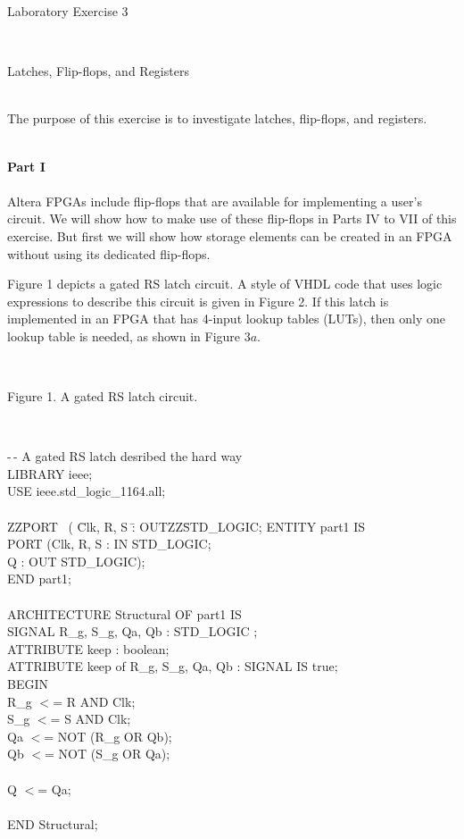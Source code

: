 \documentclass[epsfig,10pt,fullpage]{article}
\begin{document}
\centerline{\huge Laboratory Exercise 3}
~\\
\centerline{\large Latches, Flip-flops, and Registers}
~\\
\noindent
The purpose of this exercise is to investigate latches, flip-flops, and registers.

~\\
\noindent
{\bf Part I}
~\\
~\\
\noindent
\noindent
Altera FPGAs include flip-flops that are available for implementing a user's circuit. 
We will show how to make use of these flip-flops in Parts IV to VII of this exercise. But
first we will show how storage elements can be created in an FPGA without using 
its dedicated flip-flops.

Figure 1 depicts a gated RS latch circuit. A style of VHDL code that 
uses logic expressions to describe this circuit is given in Figure 2.
If this latch is implemented
in an FPGA that has 4-input lookup tables (LUTs), then only one lookup table is needed, 
as shown in Figure 3$a$. 
~\\

\begin{figure}[H]
\scriptsize
\centerline{
\hbox{}}
\end{figure}
~\\
\centerline{Figure 1.  A gated RS latch circuit.}
~\\
\begin{center}
\begin{minipage}[t]{12.5 cm}
\begin{tabbing}
-\,- A gated RS latch desribed the hard way\\
LIBRARY ieee;\\
USE ieee.std\_logic\_1164.all;\\
\\
ZZ\=PORT ~( \=Clk, R, S	\=: OUTZZ\=STD\_LOGIC;\kill
ENTITY part1 IS\\
\>PORT (\>Clk, R, S \>: IN	\>STD\_LOGIC;\\
\>\>Q \>: OUT \>STD\_LOGIC);\\
END part1;\\
\\
ARCHITECTURE Structural OF part1 IS\\
\>SIGNAL R\_g, S\_g, Qa, Qb : STD\_LOGIC ;\\
\>ATTRIBUTE keep : boolean;\\
\>ATTRIBUTE keep of R\_g, S\_g, Qa, Qb : SIGNAL IS true;\\
BEGIN	\\
\>R\_g $<$= R AND Clk;\\
\>S\_g $<$= S AND Clk;\\
\>Qa $<$= NOT (R\_g OR Qb);\\
\>Qb $<$= NOT (S\_g OR Qa);\\
~\\
\>Q $<$= Qa;\\
~\\
END Structural;\\

\end{tabbing}
\end{minipage}
\end{center}
\end{document}
